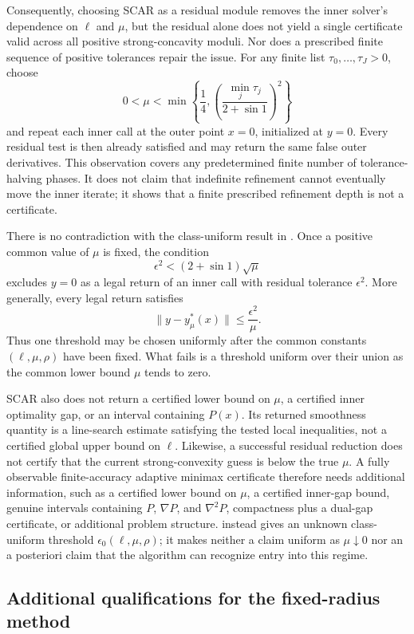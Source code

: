 \documentclass{article}
\begin{document}
Consequently, choosing SCAR as a residual module removes the inner
solver's dependence on $\ell$ and $\mu$, but the residual alone does
not yield a single certificate valid across all positive
strong-concavity moduli.  Nor does a prescribed finite sequence of
positive tolerances repair the issue.  For any finite list
$\tau_0,\ldots,\tau_J>0$, choose
\[
 0<\mu<\min\left\{\frac14,
  \left(\frac{\min_j\tau_j}{2+\sin 1}\right)^2\right\}
\]
and repeat each inner call at the outer point $x=0$, initialized at
$y=0$.  Every residual test is then already satisfied and may return
the same false outer derivatives.
This observation covers any predetermined finite number of
tolerance-halving phases.  It does not claim that indefinite
refinement cannot eventually move the inner iterate; it shows that a
finite prescribed refinement depth is not a certificate.

There is no contradiction with the class-uniform result in
.  Once a positive common value of $\mu$ is
fixed, the condition
\[
 \epsilon^2<(2+\sin 1)\sqrt\mu
\]
excludes $y=0$ as a legal return of an inner call with residual
tolerance $\epsilon^2$.  More generally, every legal return satisfies
\[
 \|y-y_\mu^*(x)\|\le\frac{\epsilon^2}{\mu}.
\]
Thus one threshold may be chosen uniformly after the common constants
$(\ell,\mu,\rho)$ have been fixed.  What fails is a threshold uniform
over their union as the common lower bound $\mu$ tends to zero.

SCAR also does not return a certified lower bound on $\mu$, a certified
inner optimality gap, or an interval containing $P(x)$.  Its returned
smoothness quantity is a line-search estimate satisfying the tested
local inequalities, not a certified global upper bound on $\ell$.
Likewise, a successful residual reduction does not certify that the
current strong-convexity guess is below the true $\mu$.  A fully
observable finite-accuracy adaptive minimax certificate therefore
needs additional
information, such as a certified lower bound on $\mu$, a certified
inner-gap bound, genuine intervals containing $P$, $\nabla P$, and
$\nabla^2P$, compactness plus a dual-gap certificate, or additional
problem structure.   instead gives an unknown
class-uniform threshold $\epsilon_0(\ell,\mu,\rho)$; it makes neither
a claim uniform as $\mu\downarrow0$ nor an a posteriori claim that the
algorithm can recognize entry into this regime.

\subsection{Additional qualifications for the fixed-radius method}
\label{app:fixed-radius-scope}
\end{document}
